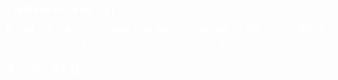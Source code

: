\documentclass[12pt,a4paper]{article}
\begin{document}
\begin{center}
\colorbox{finalgreen}{\begin{minipage}{\textwidth}
\begin{center}
\textcolor{white}{
    {\Huge\textbf{CERTIFICATE III}}\\[0.5cm]
    {\Large\textbf{Final Acceptance and Payment Authorization Certificate}}\\[0.3cm]
    {\large Public Works Department, Government of Rajasthan}
}
\end{center}
\end{minipage}}

\vspace{0.5cm}
\begin{turn}{-15}
\colorbox{finalgreen}{\textcolor{white}{\textbf{\Large ACCEPTED}}}
\end{turn}
\end{center}

\vspace{1cm}
\end{document}
